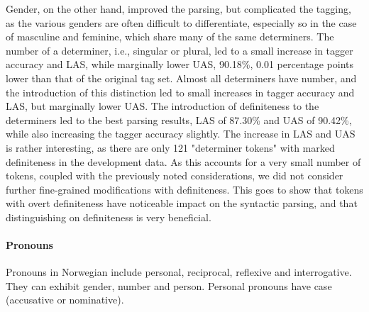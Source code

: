 \documentclass[11pt,a4paper]{article}
\begin{document}
Gender, on the other hand, improved the parsing, but complicated the tagging,
as the various genders are often difficult to differentiate, especially so in
the case of masculine and feminine, which share many of the same determiners.
The number of a determiner, i.e., singular or plural, led to a small increase
in tagger accuracy and LAS, while marginally lower UAS, 90.18\%, 0.01
percentage points lower than that of the original tag set. Almost all
determiners have number, and the introduction of this distinction led to small
increases in tagger accuracy and LAS, but marginally lower UAS. The
introduction of definiteness to the determiners led to the best parsing
results, LAS of 87.30\% and UAS of 90.42\%, while also increasing the tagger
accuracy slightly. The increase in LAS and UAS is rather interesting, as there
are only 121 "determiner tokens" with marked definiteness in the development
data. As this accounts for a very small number of tokens, coupled with the
previously noted considerations, we did not consider further fine-grained
modifications with definiteness. This goes to show that tokens with overt
definiteness have noticeable impact on the syntactic parsing, and that
distinguishing on definiteness is very beneficial.


\paragraph{Pronouns}
Pronouns in Norwegian include personal, reciprocal, reflexive and
interrogative. They can exhibit gender, number and person. Personal pronouns
have case (accusative or nominative).
\end{document}
